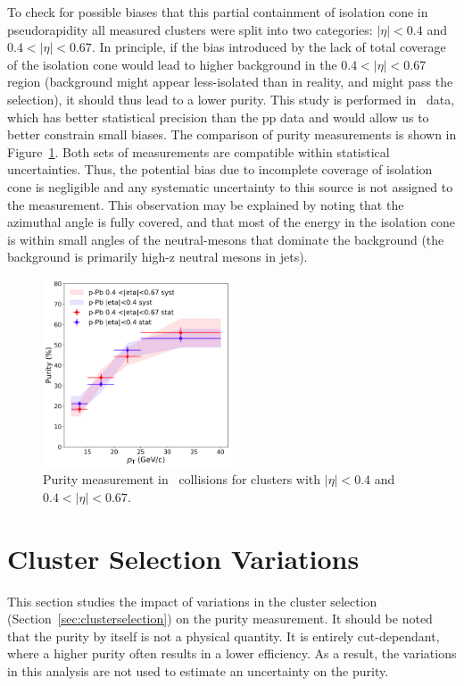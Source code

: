 To check for possible biases that this partial containment of isolation cone in pseudorapidity all measured clusters were split into two categories: $|\eta|<0.4$ and $0.4<|\eta|<0.67$. In principle, if the bias introduced by the lack of total coverage of the isolation cone would lead to higher background in the $0.4<|\eta|<0.67$ region (background might appear less-isolated than in reality, and might pass the selection), it should thus lead to a lower purity. This study is performed in \pPb~data, which has better statistical precision than the pp data and would allow us to better constrain small biases. The comparison of purity measurements is shown in Figure~\ref{fig:spliteta}. Both sets of measurements are compatible within statistical uncertainties. Thus, the potential bias due to incomplete coverage of isolation cone is negligible and any systematic uncertainty to this source is not assigned to the measurement. This observation may be explained by noting that the azimuthal angle is fully covered, and that most of the energy in the isolation cone is within small angles of the neutral-mesons that dominate the background (the background is primarily high-z neutral mesons in jets). 

\begin{figure}
	\center
	\includegraphics[width=0.5\textwidth]{Checks_Systematics/SplitEtaStudy}
	\caption{Purity measurement in \pPb~collisions for clusters with $|\eta|<0.4$ and $0.4<|\eta|<0.67$.}
	\label{fig:spliteta}
\end{figure}

\section{Cluster Selection Variations}
\label{sec:clustercutselectionvariation}
This section studies the impact of variations in the cluster selection (Section~\ref{sec:clusterselection}) on the purity measurement. It should be noted that the purity by itself is not a physical quantity. It is entirely cut-dependant, where a higher purity often results in a lower efficiency. As a result, the variations in this analysis are not used to estimate an uncertainty on the purity.

